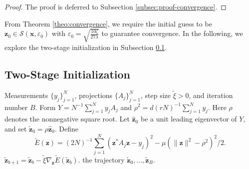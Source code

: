 \documentclass{article}
\newcommand{\calS}{{\mathcal S}}
\newcommand{\vx}{{\mathbf x}}
\newcommand{\vz}{{\mathbf z}}
\newcommand{\0}{{\mathbf 0}}
\numberwithin{equation}{section}
\begin{document}
	\begin{proof}
		The proof is deferred to Subsection \ref{subsec:proof-convergence}.
	\end{proof}
	From Theorem \ref{theo:convergence}, we require the initial guess to be $\vz_0\in\calS(\vx,\varepsilon_0)$ with $\varepsilon_0 = \sqrt{\frac{10\zeta}{27\lambda}}$ to guarantee convergence. In the following, we explore the two-stage initialization in Subsection \ref{subsec:2stage}.
	\subsection{Two-Stage Initialization}\label{subsec:2stage}
	\begin{algorithm}[ht]
		\caption{Two-stage initialization}
		\label{alg:two_stage_initialization}
		\begin{algorithmic}[1]
			\Require Measurements $\{y_j\}_{j=1}^N$, projections $\{A_j\}_{j=1}^N$, step size $\widetilde \xi>0$, and iteration number $B$.
			\State Form $Y=N^{-1}\sum_{j=1}^Ny_jA_j$ and $\rho^2=d(rN)^{-1}\sum_{j=1}^Ny_j$. Here $\rho$ denotes the nonnegative square root. 
			\State Let $\widehat\vz_0$ be a unit leading eigenvector of $Y$, and set $\widetilde\vz_0=\rho\widehat\vz_0$.
			\State Define 
			\[\widetilde E(\vz)=(2N)^{-1}\sum_{j=1}^N(\vz^*A_j\vz-y_j)^2-\mu(\|\vz\| ^2-\rho^2)^2/2.\]
			\State $\widetilde\vz_{b+1}=\widetilde\vz_b-\widetilde\xi\nabla_{\vz}\widetilde E(\widetilde\vz_b)$.
			\EndFor
			\State \Return the trajectory $\widetilde\vz_0,\ldots,\widetilde\vz_B$.
		\end{algorithmic}
	\end{algorithm}
	
\end{document}
